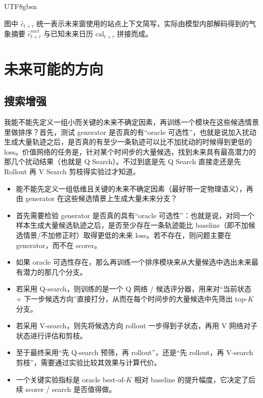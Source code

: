 \documentclass[11pt]{article}
\newif\ifneedsectionclearpage
\let\oldsection\section
\renewcommand{\section}{%
  \ifneedsectionclearpage
    \clearpage
  \else
    \global\needsectionclearpagetrue
  \fi
  \oldsection
}
\begin{document}
\begin{CJK}{UTF8}{gbsn}
\begin{figure}[t]
\begin{tikzpicture}[
    block/.style={ draw, fill=yellow!25 },
    edgelabel/.style={ midway, sloped, above, font=\scriptsize },
    branch/.style={ pos=0.5, inner sep=0mm, outer sep=0mm }
]
\end{tikzpicture}
\end{figure}

\noindent 图中 $\hat c_{t+\tau}$ 统一表示未来窗使用的站点上下文简写，实际由模型内部解码得到的气象摘要 $\hat c^{met}_{t+\tau}$ 与已知未来日历 $\mathrm{cal}_{t+\tau}$ 拼接而成。

\medskip


\section{未来可能的方向}

\subsection{搜索增强}

我能不能先定义一组小而关键的未来不确定因素，再训练一个模块在这些候选情景里做排序？首先，测试 generator 是否真的有“oracle 可选性”，也就是说加入扰动生成大量轨迹之后，是否真的有至少一条轨迹可以比不加扰动的时候得到更低的 loss。价值网络的任务是，针对某个时间步的大量候选，找到未来具有最高潜力的那几个扰动结果（也就是 Q Search）。不过到底是先 Q Search 直接走还是先 Rollout 再 V Search 剪枝得实验过才知道。

\begin{itemize}
  \item 能不能先定义一组低维且关键的未来不确定因素（最好带一定物理语义），再由 generator 在这些候选情景上生成大量未来分支？
  \item 首先需要检验 generator 是否真的具有“oracle 可选性”：也就是说，对同一个样本生成大量候选轨迹之后，是否至少存在一条轨迹能比 baseline（即不加候选情景/不加修正时）取得更低的未来 loss。若不存在，则问题主要在 generator，而不在 scorer。
  \item 如果 oracle 可选性存在，那么再训练一个排序模块来从大量候选中选出未来最有潜力的那几个分支。
  \item 若采用 Q-search，则训练的是一个 Q 网络 / 候选评分器，用来对“当前状态 + 下一步候选方向”直接打分，从而在每个时间步的大量候选中先筛出 top-$K$ 分支。
  \item 若采用 V-search，则先将候选方向 rollout 一步得到子状态，再用 V 网络对子状态进行评估和剪枝。
  \item 至于最终采用“先 Q-search 预筛，再 rollout”，还是“先 rollout，再 V-search 剪枝”，需要通过实验比较其效果与计算代价。
  \item 一个关键实验指标是 oracle best-of-$K$ 相对 baseline 的提升幅度，它决定了后续 scorer / search 是否值得做。
\end{itemize}


\end{CJK}
\end{document}
